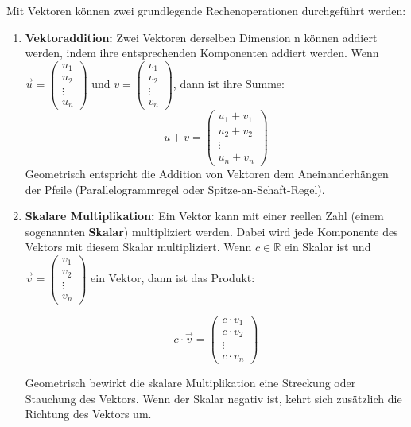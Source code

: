 Mit Vektoren können zwei grundlegende Rechenoperationen durchgeführt werden:
%
\begin{enumerate}
\item \textbf{Vektoraddition:} Zwei Vektoren derselben Dimension n können addiert werden, indem ihre entsprechenden Komponenten addiert werden. Wenn $\vec{u} = \begin{pmatrix}
    u_1 \\ u_2 \\ \vdots \\ u_n
\end{pmatrix}$ und $v = \begin{pmatrix}
    v_1 \\ v_2 \\ \vdots \\ v_n
\end{pmatrix}$, dann ist ihre Summe: 
\[
    u + v = \begin{pmatrix}
        u_1 + v_1 \\ u_2 + v_2 \\ \vdots \\ u_n + v_n
    \end{pmatrix}
\]
Geometrisch entspricht die Addition von Vektoren dem Aneinanderhängen der Pfeile (Parallelogrammregel oder Spitze-an-Schaft-Regel).

\item \textbf{Skalare Multiplikation:} Ein Vektor kann mit einer reellen Zahl (einem sogenannten \textbf{Skalar}) multipliziert werden. Dabei wird jede Komponente des Vektors mit diesem Skalar multipliziert. Wenn $c \in \mathbb{R}$ ein Skalar ist und $\vec{v} = \begin{pmatrix} v_1 \\ v_2 \\ \vdots \\ v_n \end{pmatrix}$ ein Vektor, dann ist das Produkt:

\[
c \cdot \vec{v} = \begin{pmatrix} c \cdot v_1 \\ c \cdot v_2 \\ \vdots \\ c \cdot v_n \end{pmatrix}
\]

Geometrisch bewirkt die skalare Multiplikation eine Streckung oder Stauchung des Vektors. Wenn der Skalar negativ ist, kehrt sich zusätzlich die Richtung des Vektors um.

\end{enumerate}

